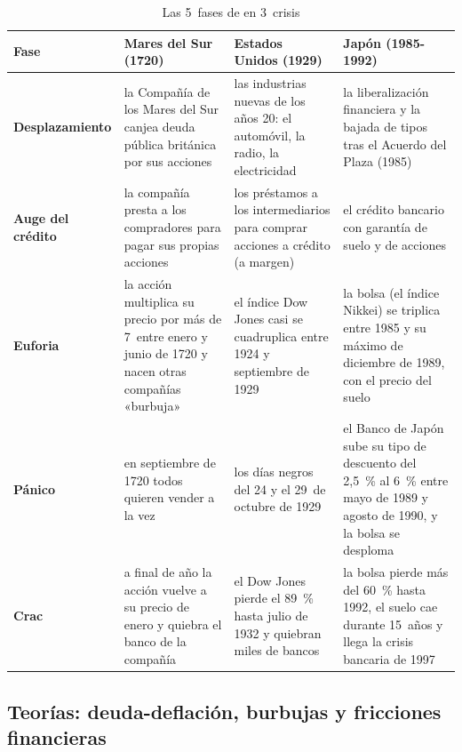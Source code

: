 \documentclass[11pt]{article}
\begin{document}
\begin{table}[H]
\centering
\caption{Las 5~fases de  en 3~crisis}\label{tab:fases-kindleberger}
\small
\begin{tabular}{>{\raggedright\arraybackslash}m{2.6cm}|>{\raggedright\arraybackslash}m{3.9cm}|>{\raggedright\arraybackslash}m{3.9cm}|>{\raggedright\arraybackslash}m{3.9cm}}
\rowcolor{tceeazulpalido}\textbf{Fase} & \textbf{Mares del Sur (1720)} & \textbf{Estados Unidos (1929)} & \textbf{Japón (1985-1992)}\\ \hline
\textbf{Desplazamiento} & la Compañía de los Mares del Sur canjea deuda pública británica por sus acciones & las industrias nuevas de los años 20: el automóvil, la radio, la electricidad & la liberalización financiera y la bajada de tipos tras el Acuerdo del Plaza (1985)\\ \hline
\textbf{Auge del crédito} & la compañía presta a los compradores para pagar sus propias acciones & los préstamos a los intermediarios para comprar acciones a crédito (a margen) & el crédito bancario con garantía de suelo y de acciones\\ \hline
\textbf{Euforia} & la acción multiplica su precio por más de 7~entre enero y junio de 1720 y nacen otras compañías «burbuja» & el índice Dow Jones casi se cuadruplica entre 1924 y septiembre de 1929 & la bolsa (el índice Nikkei) se triplica entre 1985 y su máximo de diciembre de 1989, con el precio del suelo\\ \hline
\textbf{Pánico} & en septiembre de 1720 todos quieren vender a la vez & los días negros del 24 y el 29~de octubre de 1929 & el Banco de Japón sube su tipo de descuento del 2,5~\% al 6~\% entre mayo de 1989 y agosto de 1990, y la bolsa se desploma\\ \hline
\textbf{Crac} & a final de año la acción vuelve a su precio de enero y quiebra el banco de la compañía & el Dow Jones pierde el 89~\% hasta julio de 1932 y quiebran miles de bancos & la bolsa pierde más del 60~\% hasta 1992, el suelo cae durante 15~años y llega la crisis bancaria de 1997\\
\end{tabular}
\end{table}

\subsection{Teorías: deuda-deflación, burbujas y fricciones financieras}\label{sec:teorias}
\end{document}
